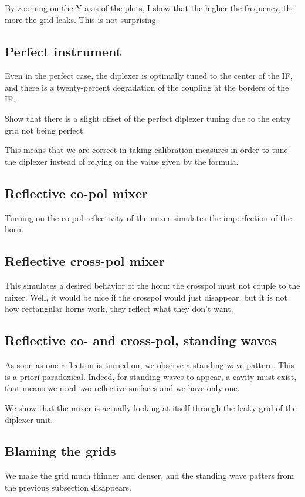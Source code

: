 By zooming on the Y axis of the plots, I show that the higher the frequency, the more the grid leaks.  This is not surprising.

\subsection{Perfect instrument}
Even in the perfect case, the diplexer is optimally tuned to the center of the IF, and there is a twenty-percent degradation of the coupling at the borders of the IF.

Show that there is a slight offset of the perfect diplexer tuning due to the entry grid not being perfect.

This means that we are correct in taking calibration measures in order to tune the diplexer instead of relying on the value given by the formula.

\subsection{Reflective co-pol mixer}
Turning on the co-pol reflectivity of the mixer simulates the imperfection of the horn.

\subsection{Reflective cross-pol mixer}
This simulates a desired behavior of the horn: the crosspol must not couple to the mixer.
Well, it would be nice if the crosspol would just disappear, but it is not how rectangular horns work, they reflect what they don't want.

\subsection{Reflective co- and cross-pol, standing waves}
As soon as one reflection is turned on, we observe a standing wave pattern.
This is a priori paradoxical.
Indeed, for standing waves to appear, a cavity must exist, that means we need two reflective surfaces and we have only one.

We show that the mixer is actually looking at itself through the leaky grid of the diplexer unit.

\subsection{Blaming the grids}
We make the grid much thinner and denser, and the standing wave patters from the previous subsection disappears.

